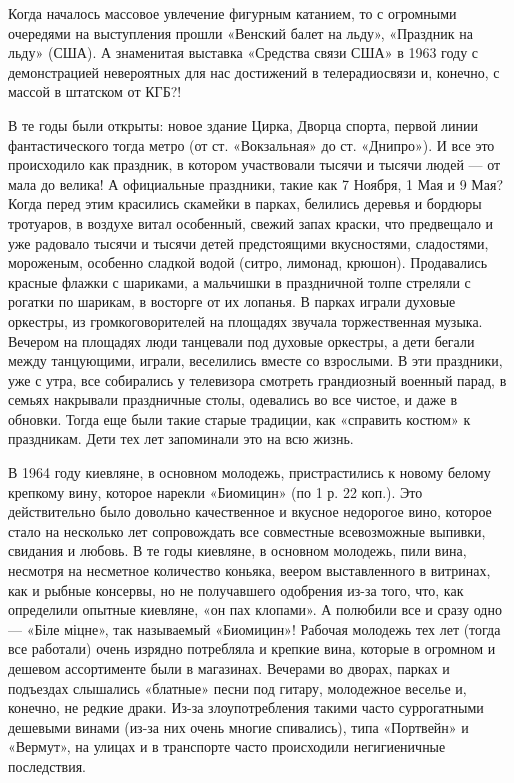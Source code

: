 Когда началось массовое увлечение фигурным катанием, то с огромными очередями
на выступления прошли «Венский балет на льду», «Праздник на льду» (США). А
знаменитая выставка «Средства связи США» в 1963 году с демонстрацией
невероятных для нас достижений в телерадиосвязи и, конечно, с массой в штатском
от КГБ?! 

В те годы были открыты: новое здание Цирка, Дворца спорта, первой линии
фантастического тогда метро (от ст. «Вокзальная» до ст. «Днипро»). И все это
происходило как праздник, в котором участвовали тысячи и тысячи людей --- от мала
до велика!  А официальные праздники, такие как 7 Ноября, 1 Мая и 9 Мая? Когда
перед этим красились скамейки в парках, белились деревья и бордюры тротуаров, в
воздухе витал особенный, свежий запах краски, что предвещало и уже радовало
тысячи и тысячи детей предстоящими вкусностями, сладостями, мороженым, особенно
сладкой водой (ситро, лимонад, крюшон). Продавались красные флажки с шариками,
а мальчишки в праздничной толпе стреляли с рогатки по шарикам, в восторге от их
лопанья. В парках играли духовые оркестры, из громкоговорителей на площадях
звучала торжественная музыка. Вечером на площадях люди танцевали под духовые
оркестры, а дети бегали между танцующими, играли, веселились вместе со
взрослыми. В эти праздники, уже с утра, все собирались у телевизора смотреть
грандиозный военный парад, в семьях накрывали праздничные столы, одевались во
все чистое, и даже в обновки. Тогда еще были такие старые традиции, как
«справить костюм» к праздникам. Дети тех лет запоминали это на всю жизнь.

В 1964 году киевляне, в основном молодежь, пристрастились к новому белому
крепкому вину, которое нарекли «Биомицин» (по 1 р. 22 коп.). Это действительно
было довольно качественное и вкусное недорогое вино, которое стало на несколько
лет сопровождать все совместные всевозможные выпивки, свидания и любовь. В те
годы киевляне, в основном молодежь, пили вина, несмотря на несметное количество
коньяка, веером выставленного в витринах, как и рыбные консервы, но не
получавшего одобрения из-за того, что, как определили опытные киевляне, «он пах
клопами». А полюбили все и сразу одно --- «Біле міцне», так называемый
«Биомицин»! Рабочая молодежь тех лет (тогда все работали) очень изрядно
потребляла и крепкие вина, которые в огромном и дешевом ассортименте были в
магазинах. Вечерами во дворах, парках и подъездах слышались «блатные» песни под
гитару, молодежное веселье и, конечно, не редкие драки. Из-за злоупотребления
такими часто суррогатными дешевыми винами (из-за них очень многие спивались),
типа «Портвейн» и «Вермут», на улицах и в транспорте часто происходили
негигиеничные последствия. 

